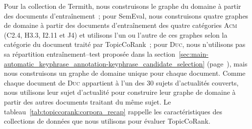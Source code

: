         Pour la collection de Termith, nous construisons le graphe du domaine à
        partir des documents d'entraînement~; pour SemEval, nous construisons
        quatre graphes de domaine à partir des documents d'entraînement des
        quatre catégories \textsc{Acm} (C2.4, H3.3, I2.11 et J4) et utilisons
        l'un ou l'autre de ces graphes selon la catégorie du document traité par
        TopicCoRank~; pour \textsc{Duc}, nous n'utilisons pas sa répartition
        entraînement--test proposée dans la
        section~\ref{sec:main-automatic_keyphrase_annotation-keyphrase_candidate_selection}
        (page~\pageref{sec:main-automatic_keyphrase_annotation-keyphrase_candidate_selection}),
        mais nous construisons un graphe de domaine unique pour chaque document.
        Comme chaque document de \textsc{Duc} appartient à l'un des 30 sujets
        d'actualités couverts, nous utilisons leur sujet d'actualité pour
        construire leur graphe de domaine à partir des autres documents traitant
        du même sujet. Le tableau~\ref{tab:topiccorank:corpora_recap} rappelle
        les caractéristiques des collections de données que nous utilisons pour
        évaluer TopicCoRank.
